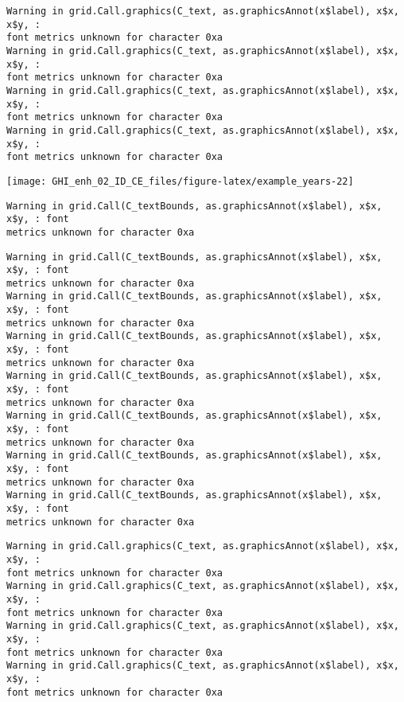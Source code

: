 \documentclass[
  10pt,
  a4paper,oneside]{article}
\begin{document}
\begin{verbatim}
Warning in grid.Call.graphics(C_text, as.graphicsAnnot(x$label), x$x, x$y, :
font metrics unknown for character 0xa
Warning in grid.Call.graphics(C_text, as.graphicsAnnot(x$label), x$x, x$y, :
font metrics unknown for character 0xa
Warning in grid.Call.graphics(C_text, as.graphicsAnnot(x$label), x$x, x$y, :
font metrics unknown for character 0xa
Warning in grid.Call.graphics(C_text, as.graphicsAnnot(x$label), x$x, x$y, :
font metrics unknown for character 0xa
\end{verbatim}

\begin{center}\texttt{[image: GHI\_enh\_02\_ID\_CE\_files/figure-latex/example\_years-22]} \end{center}

\begin{verbatim}
Warning in grid.Call(C_textBounds, as.graphicsAnnot(x$label), x$x, x$y, : font
metrics unknown for character 0xa
\end{verbatim}

\begin{verbatim}
Warning in grid.Call(C_textBounds, as.graphicsAnnot(x$label), x$x, x$y, : font
metrics unknown for character 0xa
Warning in grid.Call(C_textBounds, as.graphicsAnnot(x$label), x$x, x$y, : font
metrics unknown for character 0xa
Warning in grid.Call(C_textBounds, as.graphicsAnnot(x$label), x$x, x$y, : font
metrics unknown for character 0xa
Warning in grid.Call(C_textBounds, as.graphicsAnnot(x$label), x$x, x$y, : font
metrics unknown for character 0xa
Warning in grid.Call(C_textBounds, as.graphicsAnnot(x$label), x$x, x$y, : font
metrics unknown for character 0xa
Warning in grid.Call(C_textBounds, as.graphicsAnnot(x$label), x$x, x$y, : font
metrics unknown for character 0xa
Warning in grid.Call(C_textBounds, as.graphicsAnnot(x$label), x$x, x$y, : font
metrics unknown for character 0xa
\end{verbatim}

\begin{verbatim}
Warning in grid.Call.graphics(C_text, as.graphicsAnnot(x$label), x$x, x$y, :
font metrics unknown for character 0xa
Warning in grid.Call.graphics(C_text, as.graphicsAnnot(x$label), x$x, x$y, :
font metrics unknown for character 0xa
Warning in grid.Call.graphics(C_text, as.graphicsAnnot(x$label), x$x, x$y, :
font metrics unknown for character 0xa
Warning in grid.Call.graphics(C_text, as.graphicsAnnot(x$label), x$x, x$y, :
font metrics unknown for character 0xa
\end{verbatim}
\end{document}
